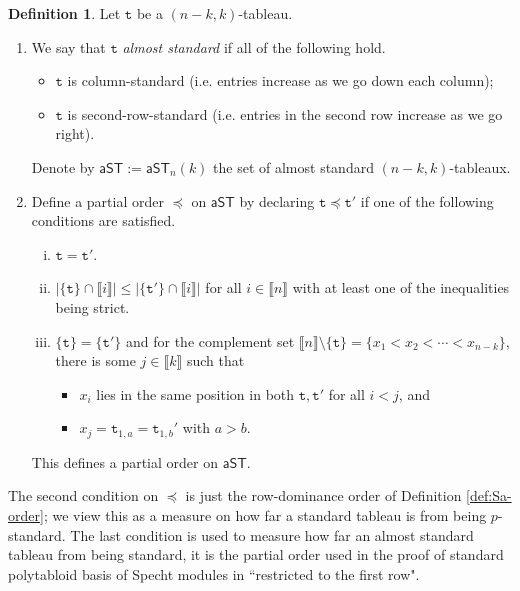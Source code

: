 \documentclass[a4paper]{amsart}
\numberwithin{equation}{subsection}
\theoremstyle{definition}
\newtheorem{definition}[theorem]{Definition}
\newcommand{\interval}[1]{\llbracket #1 \rrbracket}
\newcommand{\comm}[1]{{\color{red}#1}}
\newcommand{\tbx}{\mathtt{t}}
\newcommand{\aST}{\mathsf{aST}}
\numberwithin{equation}{subsection}
\begin{document}
\begin{definition}\label{def:aST}
Let $\tbx$ be a $(n-k,k)$-tableau.
\begin{enumerate}[(1)]

\item We say that $\tbx$ \emph{almost standard} if all of the following hold.
\begin{itemize}
\item $\tbx$ is column-standard (i.e. entries increase as we go down each column);
\item $\tbx$ is second-row-standard (i.e. entries in the second row increase as we go right).
\end{itemize}
Denote by $\aST:=\aST_n(k)$ the set of almost standard $(n-k,k)$-tableaux.

\item Define a partial order $\preceq$ on $\aST$ by declaring $\tbx\preceq\tbx'$ if one of the following conditions are satisfied.
\begin{enumerate}[(i)]
\item $\tbx=\tbx'$.
\item $|\{\tbx\}\cap\interval{i}|\leq |\{\tbx'\}\cap\interval{i}|$ for all $i\in\interval{n}$ with at least one of the inequalities being strict.
\item $\{\tbx\}=\{\tbx'\}$ and for the complement set $\interval{n}\setminus\{\tbx\} =\{x_1 < x_2 < \cdots < x_{n-k}\}$, there is some $j\in\interval{k}$ such that
\begin{itemize}
\item $x_i$ lies in the same position in both $\tbx,\tbx'$ for all $i<j$, and
\item $x_j=\tbx_{1,a}=\tbx_{1,b}'$ with $a>b$.
\end{itemize}
\end{enumerate}
This defines a partial order on $\aST$. 
\end{enumerate}
\end{definition}
The second condition on $\preceq$ is just the row-dominance order of Definition \ref{def:Sa-order}; we view this as a measure on how far a standard tableau is from being $p$-standard.
The last condition is used to measure how far an almost standard tableau from being standard, it is the partial order used in the proof of standard polytabloid basis of Specht modules in \cite{Pe,James2}  ``restricted to the first row".
\end{document}
